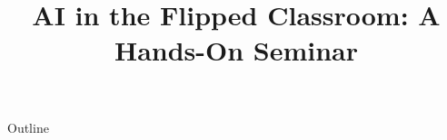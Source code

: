 \documentclass[xcolor=dvipsnames,compress,t,pdf,notes,9pt]{beamer}
\title[\insertframenumber /\inserttotalframenumber]{AI in the Flipped Classroom: A Hands-On Seminar}
\begin{document}
	\begin{frame}
	\titlepage
	\end{frame}

	\begin{frame}{Outline}
	    \tableofcontents
	\end{frame}

	
	
	
	
	

\end{document}
